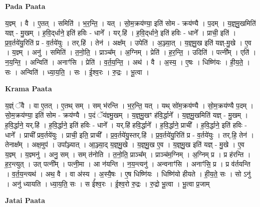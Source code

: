 \documentclass[17pt]{extarticle}
\begin{document}
\textbf{Pada Paata} \newline

य॒ज्ञ्म् । वै । ए॒तत् । समिति॑ । भ॒र॒न्ति॒ । यत् । सो॒म॒क्रय॑ण्या॒ इति॑ सोम - क्रय॑ण्यै । प॒दम् । य॒ज्ञ्॒मु॒खमिति॑ यज्ञ् - मु॒खम् । ह॒वि॒द्‌र्धाने॒ इति॑ हविः - धाने᳚ । यर्.हि॑ । ह॒वि॒द्‌र्धाने॒ इति॑ हविः - धाने᳚ । प्राची॒ इति॑ । प्र॒व॒र्तये॑यु॒रिति॑ प्र - व॒र्तये॑युः । तर्.हि॑ । तेन॑ । अक्ष᳚म् । उपेति॑ । अ॒ञ्ज्या॒त् । य॒ज्ञ्॒मु॒ख इति॑ यज्ञ्-मु॒खे । ए॒व । य॒ज्ञ्म् । अनु॑ । समिति॑ । त॒नो॒ति॒ । प्राञ्च᳚म् । अ॒ग्निम् । प्रेति॑ । ह॒र॒न्ति॒ । उदिति॑ । पत्नी᳚म् । एति॑ । न॒य॒न्ति॒ । अन्विति॑ । अनाꣳ॑सि । प्रेति॑ । व॒र्त॒य॒न्ति॒ । अथ॑ । वै । अ॒स्य॒ । ए॒षः । धिष्णि॑यः । ही॒य॒ते॒ । सः । अन्विति॑ । ध्या॒य॒ति॒ । सः । ई॒श्व॒रः । रु॒द्रः । भू॒त्वा ।  \newline


\textbf{Krama Paata} \newline

य॒ज्ञ्ं ॅवै । वा ए॒तत् । ए॒तथ् सम् । सम् भ॑रन्ति । भ॒र॒न्ति॒ यत् । यथ् सो॑म॒क्रय॑ण्यै । सो॒म॒क्रय॑ण्यै प॒दम् । सो॒म॒क्रय॑ण्या॒ इति॑ सोम - क्रय॑ण्यै । प॒दं ॅय॑ज्ञ्मु॒खम् । य॒ज्ञ्॒मु॒खꣳ ह॑वि॒र्द्धाने᳚ । य॒ज्ञ्॒मु॒खमिति॑ यज्ञ् - मु॒खम् । ह॒वि॒र्द्धाने॒ यर्.हि॑ । ह॒वि॒र्द्धाने॒ इति॑ हविः - धाने᳚ । यर्.हि॑ हवि॒र्द्धाने᳚ । ह॒वि॒र्द्धाने॒ प्राची᳚ । ह॒वि॒र्द्धाने॒ इति॑ हविः - धाने᳚ । प्राची᳚ प्रव॒र्तये॑युः । प्राची॒ इति॒ प्राची᳚ । प्र॒व॒र्तये॑यु॒स्तर्.हि॑ । प्र॒व॒र्तये॑यु॒रिति॑ प्र - व॒र्तये॑युः । तर्.हि॒ तेन॑ । तेनाक्ष᳚म् । अक्ष॒मुप॑ । उपा᳚ञ्ज्यात् । आ॒ञ्ज्या॒द् य॒ज्ञ्॒मु॒खे । य॒ज्ञ्॒मु॒ख ए॒व । य॒ज्ञ्॒मु॒ख इति॑ यज्ञ् - मु॒खे । ए॒व य॒ज्ञ्म् । य॒ज्ञ्मनु॑ । अनु॒ सम् । सम् त॑नोति । त॒नो॒ति॒ प्राञ्च᳚म् । प्राञ्च॑म॒ग्निम् । अ॒ग्निम् प्र । प्र ह॑रन्ति । ह॒र॒न्त्युत् । उत् पत्नी᳚म् । पत्नी॒मा । आ न॑यन्ति । न॒य॒न्त्यनु॑ । अन्वनाꣳ॑सि । अनाꣳ॑सि॒ प्र । प्र व॑र्तयन्ति । व॒र्त॒य॒न्त्यथ॑ । अथ॒ वै । वा अ॑स्य । अ॒स्यै॒षः । ए॒ष धिष्णि॑यः । धिष्णि॑यो हीयते । ही॒य॒ते॒ सः । सो ऽनु॑ । अनु॑ ध्यायति । ध्या॒य॒ति॒ सः । स ई᳚श्व॒रः । ई॒श्व॒रो रु॒द्रः । रु॒द्रो भू॒त्वा । भू॒त्वा प्र॒जाम् \newline

\textbf{Jatai Paata} \newline
\end{document}
